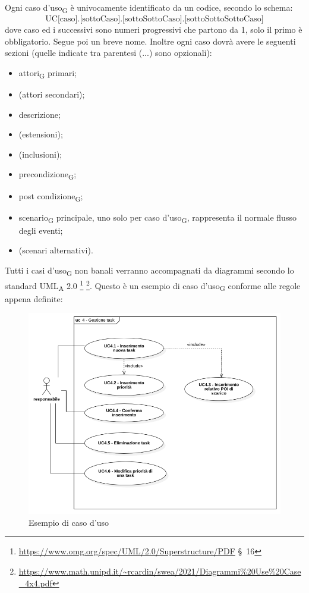                 Ogni caso d'uso\textsubscript{G} è univocamente identificato da un codice, secondo lo schema:
                $$\text{UC[caso].[sottoCaso].[sottoSottoCaso].[sottoSottoSottoCaso]}$$
                dove caso ed i successivi sono numeri progressivi che partono da 1, solo il primo è obbligatorio. Segue poi un breve nome. Inoltre ogni caso dovrà avere le seguenti sezioni (quelle indicate tra parentesi (...) sono opzionali):
                \begin{itemize}
                    \item attori\textsubscript{G} primari;
                    \item (attori secondari);
                    \item descrizione;
                    \item (estensioni);
                    \item (inclusioni);
                    \item precondizione\textsubscript{G};
                    \item post condizione\textsubscript{G};
                    \item scenario\textsubscript{G} principale, uno solo per caso d'uso\textsubscript{G}, rappresenta il normale flusso degli eventi;
                    \item (scenari alternativi).
                \end{itemize}

                Tutti i casi d'uso\textsubscript{G} non banali verranno accompagnati da diagrammi secondo lo standard UML\textsubscript{A} 2.0 \footnote{\url{https://www.omg.org/spec/UML/2.0/Superstructure/PDF} \S\ 16} \footnote{\url{https://www.math.unipd.it/~rcardin/swea/2021/Diagrammi\%20Use\%20Case_4x4.pdf}}.
                Questo è un esempio di caso d'uso\textsubscript{G} conforme alle regole appena definite:
                \begin{figure}[H]
                    \centering
                    \includegraphics[scale=0.5]{res/images/esempio_use_case.png}
                    \caption{Esempio di caso d'uso}
                \end{figure}

